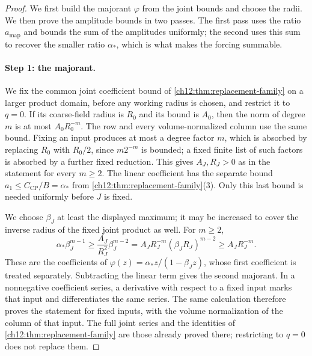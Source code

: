 \begin{proof}
We first build the majorant $\varphi$ from the joint bounds and choose the radii. We then prove the amplitude bounds in two passes. The first pass uses the ratio $a_{\mathrm{map}}$ and bounds the sum of the amplitudes uniformly; the second uses this sum to recover the smaller ratio $\alpha_*$, which is what makes the forcing summable.

\paragraph{Step 1: the majorant.}
We fix the common joint coefficient bound of \cref{ch12:thm:replacement-family} on a larger product domain, before any working radius is chosen, and restrict it to $q=0$. If its coarse-field radius is $R_0$ and its bound is $A_0$, then the norm of degree $m$ is at most $A_0R_0^{-m}$. The row and every volume-normalized column use the same bound. Fixing an input produces at most a degree factor $m$, which is absorbed by replacing $R_0$ with $R_0/2$, since $m2^{-m}$ is bounded; a fixed finite list of such factors is absorbed by a further fixed reduction. This gives $A_J,R_J>0$ as in the statement for every $m\ge2$. The linear coefficient has the separate bound $a_1\le C_{\mathrm{CP}}/B=\alpha_*$ from \cref{ch12:thm:replacement-family}(3). Only this last bound is needed uniformly before $J$ is fixed.

We choose $\beta_J$ at least the displayed maximum; it may be increased to cover the inverse radius of the fixed joint product as well. For $m\ge2$,
\begin{equation}
 \alpha_*\beta_J^{m-1}\ge\frac{A_J}{R_J^2}\beta_J^{m-2}=A_JR_J^{-m}(\beta_JR_J)^{m-2}\ge A_JR_J^{-m}. \label{ch12:eq:majorant-coeff}
\end{equation}
These are the coefficients of $\varphi(z)=\alpha_*z/(1-\beta_Jz)$, whose first coefficient is treated separately. Subtracting the linear term gives the second majorant. In a nonnegative coefficient series, a derivative with respect to a fixed input marks that input and differentiates the same series. The same calculation therefore proves the statement for fixed inputs, with the volume normalization of the column of that input. The full joint series and the identities of \cref{ch12:thm:replacement-family} are those already proved there; restricting to $q=0$ does not replace them.


\end{proof}

